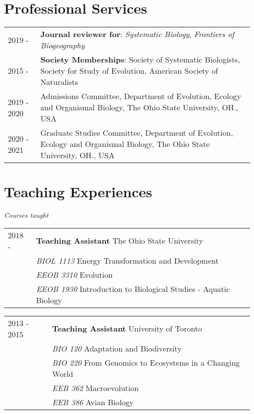 \documentclass[10pt]{article}
\begin{document}
\section*{Professional Services}
\begin{longtable}{p{}  p{}}

2019 -  &	\textbf{Journal reviewer for}: \textit{Systematic Biology}, \textit{Frontiers of Biogeography}\\
2015 - &  \textbf{Society Memberships}: Society of Systematic Biologists, Society for Study of Evolution, American Society of Naturalists\\
2019 - 2020 &	Admissions Committee, Department of Evolution, Ecology and Organismal Biology, The Ohio State University, OH., USA\\
2020 - 2021 &  Graduate Studies Committee, Department of Evolution, Ecology and Organismal Biology, The Ohio State University, OH., USA


\end{longtable}


\section*{Teaching Experiences}
\textit{Courses taught}

\begin{longtable}{p{}  p{}}

2018 -  &	\textbf{Teaching Assistant} The Ohio State University\\
 & \textit{BIOL 1113} Energy Transformation and Development\\
& \textit{EEOB 3310} Evolution\\
& \textit{EEOB 1930} Introduction to Biological Studies - Aquatic Biology\\

\end{longtable}



\begin{longtable}{p{}  p{}}

2013 - 2015 & \textbf{Teaching Assistant} University of Toronto\\
 & \textit{BIO 120} Adaptation and Biodiversity\\
 & \textit{BIO 220} From Genomics to Ecosystems in a Changing World\\
& \textit{EEB 362} Macroevolution\\
& \textit{EEB 386} Avian Biology\\

\end{longtable}
\end{document}
